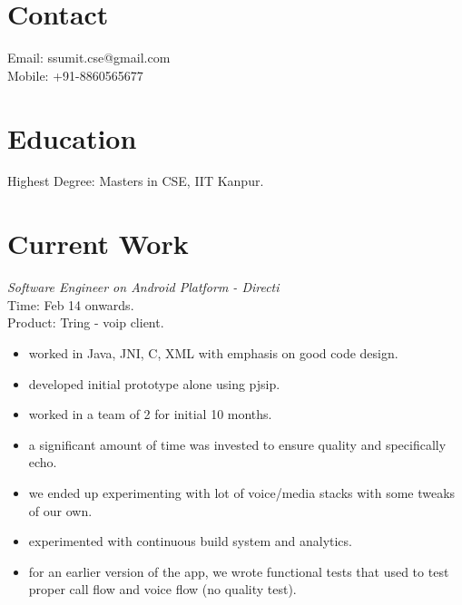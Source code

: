 \documentclass[margin,line]{resume}
\begin{document}
\begin{resume}

    \section{\mysidestyle Contact}
    	Email: ssumit.cse@gmail.com\\
    	Mobile: +91-8860565677
    \section{\mysidestyle Education}
	Highest Degree: Masters in CSE, IIT Kanpur.

    \section{\mysidestyle Current Work}

\textit{Software Engineer on Android Platform - Directi} \\
Time: Feb 14 onwards.\\
Product: Tring - voip client.\\
\begin{itemize}
	\item worked in Java, JNI, C, XML with emphasis on good code design.
        \item developed initial prototype alone using pjsip.
        \item worked in a team of 2 for initial 10 months.
	\item a significant amount of time was invested to ensure quality and specifically echo.
	\item we ended up experimenting with lot of voice/media stacks with some tweaks of our own.
	\item experimented with continuous build system and analytics.
	\item for an earlier version of the app, we wrote functional tests that used to test proper call flow and voice flow (no quality test). 
 \end{itemize}


\end{resume}
\end{document}
